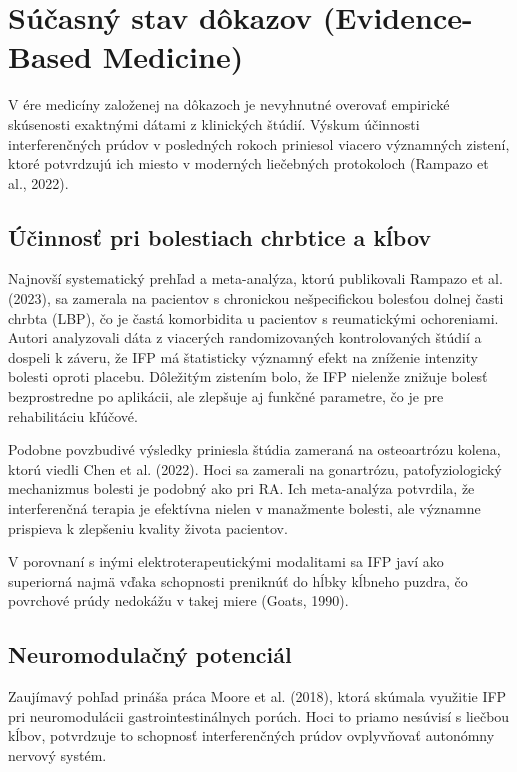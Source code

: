\section{Súčasný stav dôkazov (Evidence-Based Medicine)}

V ére medicíny založenej na dôkazoch je nevyhnutné overovať empirické skúsenosti exaktnými dátami z klinických štúdií. Výskum účinnosti interferenčných prúdov v posledných rokoch priniesol viacero významných zistení, ktoré potvrdzujú ich miesto v moderných liečebných protokoloch (Rampazo et al., 2022). 

\subsection{Účinnosť pri bolestiach chrbtice a kĺbov}

Najnovší systematický prehľad a meta-analýza, ktorú publikovali Rampazo et al. (2023), sa zamerala na pacientov s chronickou nešpecifickou bolesťou dolnej časti chrbta (LBP), čo je častá komorbidita u pacientov s reumatickými ochoreniami. Autori analyzovali dáta z viacerých randomizovaných kontrolovaných štúdií a dospeli k záveru, že IFP má štatisticky významný efekt na zníženie intenzity bolesti oproti placebu. Dôležitým zistením bolo, že IFP nielenže znižuje bolesť bezprostredne po aplikácii, ale zlepšuje aj funkčné parametre, čo je pre rehabilitáciu kľúčové. 

Podobne povzbudivé výsledky priniesla štúdia zameraná na osteoartrózu kolena, ktorú viedli Chen et al. (2022). Hoci sa zamerali na gonartrózu, patofyziologický mechanizmus bolesti je podobný ako pri RA. Ich meta-analýza potvrdila, že interferenčná terapia je efektívna nielen v manažmente bolesti, ale významne prispieva k zlepšeniu kvality života pacientov. 

V porovnaní s inými elektroterapeutickými modalitami sa IFP javí ako superiorná najmä vďaka schopnosti preniknúť do hĺbky kĺbneho puzdra, čo povrchové prúdy nedokážu v takej miere (Goats, 1990). 

\subsection{Neuromodulačný potenciál}

Zaujímavý pohľad prináša práca Moore et al. (2018), ktorá skúmala využitie IFP pri neuromodulácii gastrointestinálnych porúch. Hoci to priamo nesúvisí s liečbou kĺbov, potvrdzuje to schopnosť interferenčných prúdov ovplyvňovať autonómny nervový systém. 

